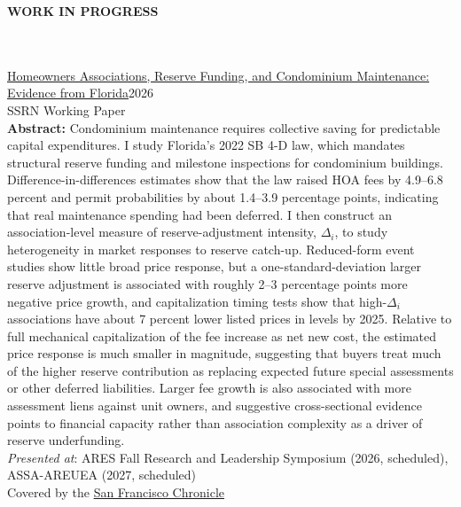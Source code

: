 \documentclass[a4paper]{article}
\newcommand{\lineunder} {
    \vspace*{-8pt} \\
    \hspace*{-18pt} \hrulefill \\
}
\newcommand{\header} [1] {
    {\hspace*{-18pt}\vspace*{1pt} \textbf{\MakeUppercase{#1}}}
    \lineunder
}
\begin{document}
\header{Work in Progress}
\vspace{1mm}
\href{https://papers.ssrn.com/sol3/papers.cfm?abstract_id=6435138}{Homeowners Associations, Reserve Funding, and Condominium Maintenance: \\ Evidence from Florida}\hfill 2026\\
\textit{}\hfill{SSRN Working Paper}\\
\vspace{3mm}
\textbf{Abstract:} Condominium maintenance requires collective saving for predictable capital expenditures. I study Florida’s 2022 SB 4-D law, which mandates structural reserve funding and milestone inspections for condominium buildings. Difference-in-differences estimates show that the law raised HOA fees by 4.9–6.8 percent and permit probabilities by about 1.4–3.9 percentage points, indicating that real maintenance spending had been deferred. I then construct an association-level measure of reserve-adjustment intensity, $\Delta_i$, to study heterogeneity in market responses to reserve catch-up. Reduced-form event studies show little broad price response, but a one-standard-deviation larger reserve adjustment is associated with roughly 2–3 percentage points more negative price growth, and capitalization timing tests show that high-$\Delta_i$ associations have about 7 percent lower listed prices in levels by 2025. Relative to full mechanical capitalization of the fee increase as net new cost, the estimated price response is much smaller in magnitude, suggesting that buyers treat much of the higher reserve contribution as replacing expected future special assessments or other deferred liabilities. Larger fee growth is also associated with more assessment liens against unit owners, and suggestive cross-sectional evidence points to financial capacity rather than association complexity as a driver of reserve underfunding.\\
\vspace{3mm}
\textit{Presented at}: ARES Fall Research and Leadership Symposium (2026, scheduled), \\ ASSA-AREUEA (2027, scheduled)\\
\vspace{3mm}
Covered by the \href{https://www.sfchronicle.com/realestate/article/hoa-condo-fee-california-22431478.php}{San Francisco Chronicle}

\vspace{5mm}
\end{document}
